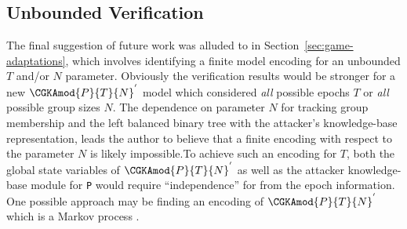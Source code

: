 \hypertarget{sec:unbounded-verification}{%
\subsection{Unbounded Verification}\label{sec:unbounded-verification}}

The final suggestion of future work was alluded to in Section\ \ref{sec:game-adaptations}, which involves identifying a finite model encoding for an unbounded \(T\) and/or \(N\) parameter.
Obviously the verification results would be stronger for a new \( \CGKAmod{P}{T}{N}^{'} \) model which considered \emph{all} possible epochs \(T\) or \emph{all} possible group sizes \(N\).
The dependence on parameter \(N\) for tracking group membership and the left balanced binary tree with the attacker's knowledge-base representation, leads the author to believe that a finite encoding with respect to the parameter \(N\) is likely impossible.To achieve such an encoding for \(T\), both the global state variables of \( \CGKAmod{P}{T}{N}^{'} \) as well as the attacker knowledge-base module for \texttt{P} would require ``independence'' for from the epoch information.
One possible approach may be finding an encoding of \( \CGKAmod{P}{T}{N}^{'} \) which is a Markov process \autocite{markov1906a}.
